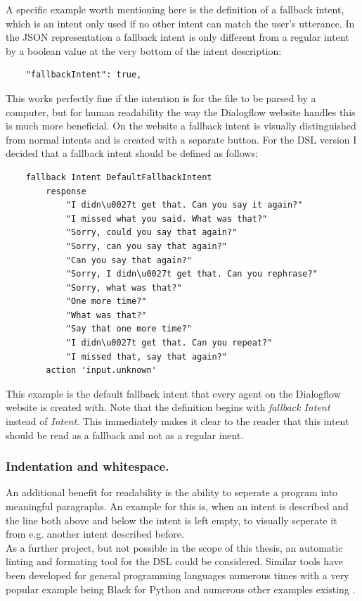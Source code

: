 A specific example worth mentioning here is the definition of a fallback intent, which is an intent only used if no other intent can match the user's utterance.
In the JSON representation a fallback intent is only different from a regular intent by a boolean value at the very bottom of the intent description:
\begin{verbatim}
    "fallbackIntent": true,
\end{verbatim}
This works perfectly fine if the intention is for the file to be parsed by a computer, but for human readability the way the Dialogflow website handles this is much more beneficial.
On the website a fallback intent is visually distinguished from normal intents and is created with a separate button.
For the DSL version I decided that a fallback intent should be defined as follows:
\begin{verbatim}
    fallback Intent DefaultFallbackIntent
        response 
            "I didn\u0027t get that. Can you say it again?"
            "I missed what you said. What was that?"
            "Sorry, could you say that again?"
            "Sorry, can you say that again?"
            "Can you say that again?"
            "Sorry, I didn\u0027t get that. Can you rephrase?"
            "Sorry, what was that?"
            "One more time?"
            "What was that?"
            "Say that one more time?"
            "I didn\u0027t get that. Can you repeat?"
            "I missed that, say that again?"
        action 'input.unknown'
\end{verbatim}
This example is the default fallback intent that every agent on the Dialogflow website is created with. Note that the definition begins with \textit{fallback Intent} instead of \textit{Intent}. This immediately makes it clear to the reader that this intent should be read as a fallback and not as a regular inent.

\subsubsection{Indentation and whitespace.}

An additional benefit for readability is the ability to seperate a program into meaningful paragraphs. An example for this is, when an intent is described and the line both above and below the intent is left empty, to visually seperate it from e.g. another intent described before.\\
As a further project, but not possible in the scope of this thesis, an automatic linting and formating tool for the DSL could be considered. Similar tools have been developed for general programming languages numerous times with a very popular example being Black for Python \cite{Python} and numerous other examples existing \cite{Github}.

